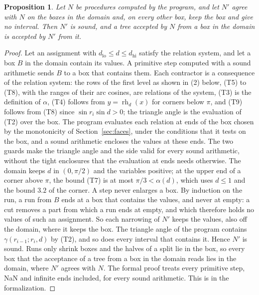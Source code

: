 \documentclass[12pt]{amsart}
\newtheorem{proposition}[theorem]{Proposition}
\theoremstyle{definition}
\theoremstyle{plain}
\theoremstyle{definition}
\newcommand{\dlo}{d_{\mathrm{lo}}}
\newcommand{\dhi}{d_{\mathrm{hi}}}
\newcommand{\leanmap}[1]{\ignorespaces}
\newcommand{\mapnote}[1]{\ignorespaces}
\begin{document}
\begin{proposition}\label{prop:sound}\leanmap{Tammes15.Contractors.Impl.onDom_sound, Tammes15.Contractors.progTrees_onDom, Tammes15.Contractors.primStep_sound, Tammes15.Contractors.primStep_subset, Tammes15.Contractors.Run.sound, Tammes15.Contractors.Run.subset, Tammes15.Contractors.wheelOut_sound}\mapnote{for all cases at once, with the procedures as a parameter of the statement and the variable of each corner attached to its dart, the first declaration, and for the trees of every case of a list, the second}
Let $N$ be procedures computed by the program, and let $N'$ agree with $N$ on the boxes in the domain and, on every other box, keep the box and give no interval. Then $N'$ is sound, and a tree accepted by $N$ from a box in the domain is accepted by $N'$ from it.
\end{proposition}

\begin{proof}
Let an assignment with $\dlo\le d\le\dhi$ satisfy the relation system, and let a box $B$ in the domain contain its values. A primitive step computed with a sound arithmetic sends $B$ to a box that contains them. Each contractor is a consequence of the relation system: the rows of the first level as shown in (2) below, (T5) to (T8), with the ranges of their arc cosines, are relations of the system, (T3) is the definition of $\alpha$, (T4) follows from $y=\operatorname{rh}_d(x)$ for corners below $\pi$, and (T9) follows from (T8) since $\sin r_i\sin d>0$; the triangle angle is the evaluation of (T2) over the box. The program evaluates each relation at ends of the box chosen by the monotonicity of Section~\ref{sec:faces}, under the conditions that it tests on the box, and a sound arithmetic encloses the values at these ends. The two guards make the triangle angle and the side valid for every sound arithmetic, without the tight enclosures that the evaluation at ends needs otherwise. The domain keeps $d$ in $(0,\pi/2)$ and the variables positive; at the upper end of a corner above $\pi$, the bound (T7) is at most $\pi/3<\alpha(d)$, which uses $d\le1$ and the bound $3.2$ of the corner. A step never enlarges a box. By induction on the run, a run from $B$ ends at a box that contains the values, and never at empty: a cut removes a part from which a run ends at empty, and which therefore holds no values of such an assignment. So each narrowing of $N'$ keeps the values, also off the domain, where it keeps the box. The triangle angle of the program contains $\gamma(r_{i-1};r_i,d)$ by (T2), and so does every interval that contains it. Hence $N'$ is sound. Runs only shrink boxes and the halves of a split lie in the box, so every box that the acceptance of a tree from a box in the domain reads lies in the domain, where $N'$ agrees with $N$. The formal proof treats every primitive step, NaN and infinite ends included, for every sound arithmetic. This is  in the formalization.
\end{proof}
\end{document}
